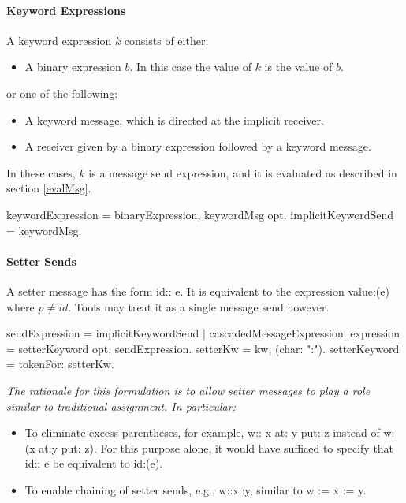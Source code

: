 \documentclass{article}
\newcommand{\code}[1]{{\sf #1}}
\begin{document}
\paragraph{Keyword Expressions}
\label{keyword}

A keyword expression $k$ consists of either:
\begin{itemize}
\item A  binary expression $b$. In this case  the value of $k$ is the value of $b$.
\end{itemize}
or one of the following:
\begin{itemize}
\item A keyword message, which is directed at the implicit receiver.
\item A receiver given by a binary expression followed by a keyword message. 
\end{itemize}
In these cases, $k$ is a message send expression, and it is evaluated as described in section \ref{evalMsg}.
\begin{newspeak}
keywordExpression =  binaryExpression, keywordMsg opt.
implicitKeywordSend = keywordMsg.
\end{newspeak}


\paragraph{Setter Sends}
\label{setter}

A setter message has the form \code{id:: e}.  It is equivalent to the expression \code{[:p $|$ id:p. p] value:(e)} where $p \ne id$.   Tools may treat it as a single message send however.

\begin{newspeak}
sendExpression = implicitKeywordSend $|$ cascadedMessageExpression. 
expression = setterKeyword opt, sendExpression.
setterKw = kw, (char: ":").
setterKeyword = tokenFor: setterKw. 
\end{newspeak}

{\it
The rationale for this formulation is to allow setter messages to play a role similar to traditional assignment. In particular:
\begin{itemize}
\item To eliminate excess parentheses, for example, \code{w:: x at: y put: z} instead of \code{w:(x at:y put: z)}. For this purpose alone, it would have sufficed to specify that  \code{id:: e} be equivalent to \code{id:(e)}. 
\item To enable chaining of setter sends, e.g., \code{w::x::y}, similar to \code{w := x := y}.
\end{itemize}
}
\end{document}
